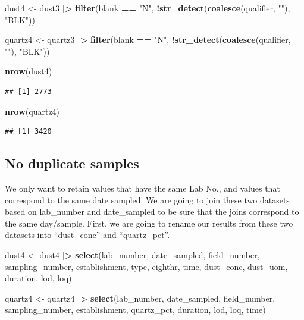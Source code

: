 \documentclass[
]{article}
\newenvironment{Shaded}{\begin{snugshade}}{\end{snugshade}}
\newcommand{\FunctionTok}[1]{\textcolor[rgb]{0.13,0.29,0.53}{\textbf{#1}}}
\newcommand{\NormalTok}[1]{#1}
\newcommand{\OtherTok}[1]{\textcolor[rgb]{0.56,0.35,0.01}{#1}}
\newcommand{\SpecialCharTok}[1]{\textcolor[rgb]{0.81,0.36,0.00}{\textbf{#1}}}
\newcommand{\StringTok}[1]{\textcolor[rgb]{0.31,0.60,0.02}{#1}}
\begin{document}
\begin{Shaded}
\begin{Highlighting}[]
\NormalTok{dust4 }\OtherTok{\textless{}{-}}\NormalTok{ dust3 }\SpecialCharTok{|\textgreater{}}
  \FunctionTok{filter}\NormalTok{(blank }\SpecialCharTok{==} \StringTok{"N"}\NormalTok{,}
         \SpecialCharTok{!}\FunctionTok{str\_detect}\NormalTok{(}\FunctionTok{coalesce}\NormalTok{(qualifier, }\StringTok{""}\NormalTok{), }\StringTok{"BLK"}\NormalTok{))}

\NormalTok{quartz4 }\OtherTok{\textless{}{-}}\NormalTok{ quartz3 }\SpecialCharTok{|\textgreater{}}
  \FunctionTok{filter}\NormalTok{(blank }\SpecialCharTok{==} \StringTok{"N"}\NormalTok{,}
         \SpecialCharTok{!}\FunctionTok{str\_detect}\NormalTok{(}\FunctionTok{coalesce}\NormalTok{(qualifier, }\StringTok{""}\NormalTok{), }\StringTok{"BLK"}\NormalTok{))}

\FunctionTok{nrow}\NormalTok{(dust4)}
\end{Highlighting}
\end{Shaded}

\begin{verbatim}
## [1] 2773
\end{verbatim}

\begin{Shaded}
\begin{Highlighting}[]
\FunctionTok{nrow}\NormalTok{(quartz4)}
\end{Highlighting}
\end{Shaded}

\begin{verbatim}
## [1] 3420
\end{verbatim}

\subsection{No duplicate samples}\label{no-duplicate-samples-1}

We only want to retain values that have the same Lab No., and values
that correspond to the same date sampled. We are going to join these two
datasets based on lab\_number and date\_sampled to be sure that the
joins correspond to the same day/sample. First, we are going to rename
our results from these two datasets into ``dust\_conc'' and
``quartz\_pct''.

\begin{Shaded}
\begin{Highlighting}[]
\NormalTok{dust4 }\OtherTok{\textless{}{-}}\NormalTok{ dust4 }\SpecialCharTok{|\textgreater{}} 
  \FunctionTok{select}\NormalTok{(lab\_number, date\_sampled, field\_number, sampling\_number, }
\NormalTok{         establishment, type, eighthr, time, dust\_conc, dust\_uom, duration, lod, loq)}

\NormalTok{quartz4 }\OtherTok{\textless{}{-}}\NormalTok{ quartz4 }\SpecialCharTok{|\textgreater{}} 
  \FunctionTok{select}\NormalTok{(lab\_number, date\_sampled, field\_number, sampling\_number, establishment,}
\NormalTok{          quartz\_pct, duration, lod, loq, time)}
\end{Highlighting}
\end{Shaded}
\end{document}
